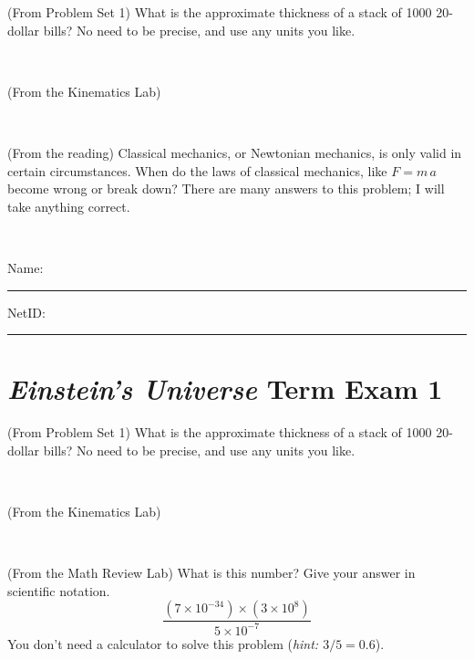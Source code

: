 \documentclass[12pt, letterpaper]{article}
\begin{document}
\begin{problem} (From Problem Set 1)
What is the approximate thickness of a stack of 1000 20-dollar bills?
No need to be precise, and use any units you like.
\end{problem}


\vfill ~

\begin{problem} (From the Kinematics Lab)

\end{problem}


\vfill ~

\begin{problem} (From the reading)
Classical mechanics, or Newtonian mechanics, is only valid in certain
circumstances. When do the laws of classical mechanics, like $F =
m\,a$ become wrong or break down? There are many answers to this
problem; I will take anything correct.
\end{problem}


\vfill ~


\cleardoublepage



\noindent
Name: \rule[-1ex]{0.60\textwidth}{0.1pt}
NetID: \rule[-1ex]{0.20\textwidth}{0.1pt}

\section*{\textsl{Einstein's Universe} Term Exam 1}
\setcounter{problem}{1}


\begin{problem} (From Problem Set 1)
What is the approximate thickness of a stack of 1000 20-dollar bills?
No need to be precise, and use any units you like.
\end{problem}


\vfill ~

\begin{problem} (From the Kinematics Lab)

\end{problem}


\vfill ~

\begin{problem} (From the Math Review Lab)
What is this number? Give your answer in scientific notation.
$$
\frac{(7\times10^{-34})\times(3\times10^8)}{5\times10^{-7}}
$$
You don't need a calculator to solve this problem (\textit{hint: $3/5=0.6$}).
\end{problem}


\vfill ~
\end{document}
